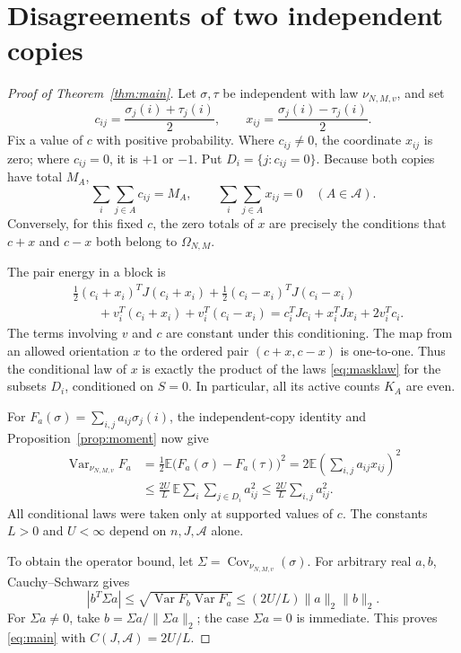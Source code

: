 \documentclass[11pt]{article}
\begin{document}
\section{Disagreements of two independent copies}\label{sec:disagreement}
\begin{proof}[Proof of Theorem~\ref{thm:main}]
Let $\sigma,\tau$ be independent with law $\nu_{N,M,v}$, and set
\[
 c_{ij}=\frac{\sigma_j(i)+\tau_j(i)}2,\qquad
 x_{ij}=\frac{\sigma_j(i)-\tau_j(i)}2.
\]
Fix a value of $c$ with positive probability. Where $c_{ij}\ne0$, the
coordinate $x_{ij}$ is zero; where $c_{ij}=0$, it is $+1$ or $-1$.
Put $D_i=\{j:c_{ij}=0\}$. Because both copies have total $M_A$,
\[
 \sum_i\sum_{j\in A}c_{ij}=M_A,\qquad
 \sum_i\sum_{j\in A}x_{ij}=0 \quad(A\in\mathcal A).
\]
Conversely, for this fixed $c$, the zero totals of $x$ are precisely the
conditions that $c+x$ and $c-x$ both belong to $\Omega_{N,M}$.

The pair energy in a block is
\begin{align*}
 &\tfrac12(c_i+x_i)^T J(c_i+x_i)
   +\tfrac12(c_i-x_i)^T J(c_i-x_i)\\
 &\hspace{2em}+v_i^T(c_i+x_i)+v_i^T(c_i-x_i)
   =c_i^T Jc_i+x_i^T Jx_i+2v_i^Tc_i.
\end{align*}
The terms involving $v$ and $c$ are constant under this conditioning.
The map from an allowed orientation $x$ to the ordered pair
$(c+x,c-x)$ is one-to-one. Thus the conditional law of $x$ is exactly the
product of the laws \eqref{eq:masklaw} for the subsets $D_i$, conditioned on
$S=0$. In particular, all its active counts $K_A$ are even.

For $F_a(\sigma)=\sum_{i,j}a_{ij}\sigma_j(i)$, the independent-copy identity
and Proposition~\ref{prop:moment} now give
\begin{align*}
 \operatorname{Var}_{\nu_{N,M,v}}F_a
 &=\tfrac12\mathbb E\bigl(F_a(\sigma)-F_a(\tau)\bigr)^2
   =2\mathbb E\left(\sum_{i,j}a_{ij}x_{ij}\right)^2\\
 &\leq\frac{2U}{L}\,
       \mathbb E\sum_i\sum_{j\in D_i}a_{ij}^2
 \leq\frac{2U}{L}\sum_{i,j}a_{ij}^2.
\end{align*}
All conditional laws were taken only at supported values of $c$.
The constants $L>0$ and $U<\infty$ depend on $n,J,\mathcal A$ alone.

To obtain the operator bound, let $\Sigma=\operatorname{Cov}_{\nu_{N,M,v}}(\sigma)$.
For arbitrary real $a,b$, Cauchy--Schwarz gives
\[
 |b^T\Sigma a|\leq\sqrt{\operatorname{Var}F_b\operatorname{Var}F_a}
 \leq(2U/L)\|a\|_2\|b\|_2.
\]
For $\Sigma a\ne0$, take $b=\Sigma a/\|\Sigma a\|_2$; the case
$\Sigma a=0$ is immediate. This proves \eqref{eq:main} with
$C(J,\mathcal A)=2U/L$.
\end{proof}
\end{document}
